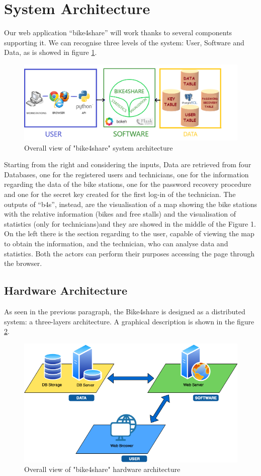 \documentclass{article}
\begin{document}
\section{System Architecture}
Our web application “bike4share” will work thanks to several components supporting it.
We can recognise three levels of the system: User, Software and Data, as is showed in figure \ref{fig:schema}. 
\begin{figure}[H]
    \centering
    \includegraphics[width=0.75\linewidth]{image/BIKE4SHARE_SCHEMA_FINAL.png}
    \caption{Overall view of "bike4share" system architecture}
    \label{fig:schema}
\end{figure}
Starting from the right and considering the inputs, Data are retrieved from four Databases, one for the registered users and technicians, one for the information regarding the data of the bike stations, one for the password recovery procedure and one for the secret key created for the first log-in of the technician.
The outputs of “b4s”, instead, are the visualisation of a map showing the bike stations with the relative information (bikes and free stalls) and the visualisation of statistics (only for technicians)and they are showed in the middle of the Figure 1. On the left there is the section regarding to the user, capable of viewing the map to obtain the information, and the technician, who can analyse data and statistics. Both the actors can perform their purposes accessing the page through the browser.
\subsection{Hardware Architecture}
As seen in the previous paragraph, the Bike4share is designed as a distributed system: a three-layers architecture. A graphical description is shown in the figure \ref{fig:over}.
\begin{figure}[h]
    \centering
    \includegraphics[width=0.55\linewidth]{image/hardware_COMPLETE.png}
    \caption{Overall view of "bike4share" hardware architecture}
    \label{fig:over}
\end{figure}
\end{document}

